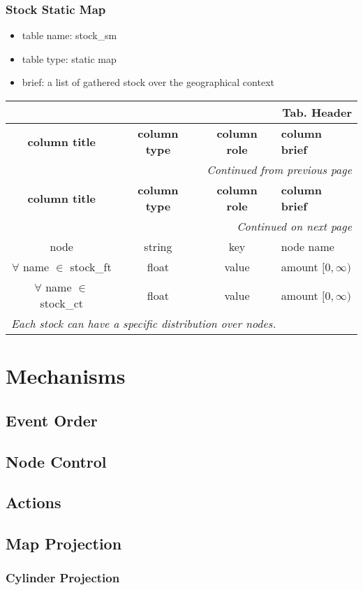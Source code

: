 \documentclass[a4paper,oneside,titlepage]{report}
\newcommand*{\LTHeaderIV}[5]{
  \multicolumn{4}{r}{\textbf{Tab. \thesubsection} \textbf{#1}}\\    
  \hline
  \textbf{#2} & \textbf{#3} & \textbf{#4} & \textbf{#5}\\
  \hline
  
  \endfirsthead
  \multicolumn{4}{r}{\textit{Continued from previous page}}\\    
  \hline
  \textbf{#2} & \textbf{#3} & \textbf{#4} & \textbf{#5}\\
  \hline
  \endhead
  \hline
  \multicolumn{4}{r}{\textit{Continued on next page}}\\
  \endfoot
  \hline
  \endlastfoot  
}
\begin{document}
\subsection{Stock Static Map}
\begin{itemize}
  \setlength{\itemsep}{0pt}
  \setlength{\parskip}{0pt}
\item table name: stock\_sm  
\item table type: static map  
\item brief: a list of gathered stock over the geographical context
\end{itemize}

\begin{longtable}{ |c|c|c|l| } 
  \LTHeaderIV{Header}{column title}{column type}{column role}{column brief}                    
  node & string & key & node name\\
  $\forall$ name $\in$ stock\_ft & float & value & amount $[0, \infty)$ \\
  $\forall$ name $\in$ stock\_ct & float & value & amount $[0, \infty)$ \\
  \multicolumn{4}{|l|}{\textit{Each stock can have a specific distribution over nodes.}}\\
\end{longtable}        

\chapter{Mechanisms}

\section{Event Order}
\section{Node Control}
\section{Actions}

\section{Map Projection}
\subsection{Cylinder Projection}
	
\end{document}
